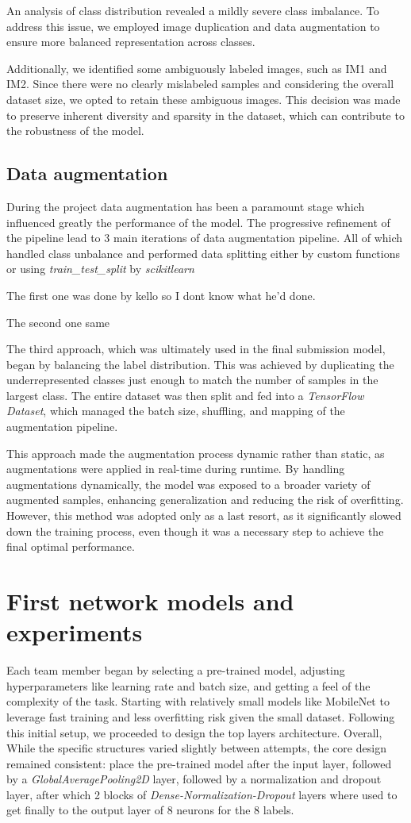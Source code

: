 \documentclass[11pt]{article}
\begin{document}
An analysis of class distribution revealed a mildly severe class imbalance. To address this issue, we employed image duplication and data augmentation to ensure more balanced representation across classes.

Additionally, we identified some ambiguously labeled images, such as IM1 and IM2. Since there were no clearly mislabeled samples and considering the overall dataset size, we opted to retain these ambiguous images. This decision was made to preserve inherent diversity and sparsity in the dataset, which can contribute to the robustness of the model.
\subsection{Data augmentation}
During the project data augmentation has been a paramount stage which influenced greatly the performance of the model. The progressive refinement of the pipeline lead to 3 main iterations of data augmentation pipeline.
All of which handled class unbalance and performed data splitting either by custom functions or using \textit{train\_test\_split} by \textit{scikit\-learn}

The first one was done by kello so I dont know what he'd done.

The second one same

The third approach, which was ultimately used in the final submission model, began by balancing the label distribution. This was achieved by duplicating the underrepresented classes just enough to match the number of samples in the largest class. The entire dataset was then split and fed into a \textit{TensorFlow Dataset}, which managed the batch size, shuffling, and mapping of the augmentation pipeline.

This approach made the augmentation process dynamic rather than static, as augmentations were applied in real-time during runtime. By handling augmentations dynamically, the model was exposed to a broader variety of augmented samples, enhancing generalization and reducing the risk of overfitting. However, this method was adopted only as a last resort, as it significantly slowed down the training process, even though it was a necessary step to achieve the final optimal performance.

\section{First network models and experiments}
Each team member began by selecting a pre-trained model, adjusting hyperparameters like learning rate and batch size, and getting a feel of the complexity of the task.
Starting with relatively small models like MobileNet to leverage fast training and less overfitting risk given the small dataset. 
Following this initial setup, we proceeded to design the top layers architecture. Overall, While the specific structures varied slightly between attempts, the core design remained consistent: place the pre-trained model after the input layer, followed by a \textit{GlobalAveragePooling2D} layer, followed by a normalization and dropout layer, after which 2 blocks of \textit{Dense-Normalization-Dropout} layers where used to get finally to the output layer of 8 neurons for the 8 labels.
\end{document}
